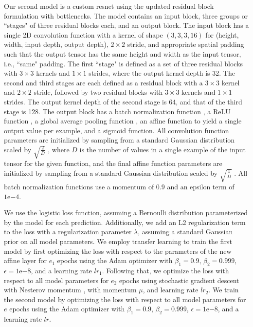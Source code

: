 Our second model is a custom \gls{resnet} using the updated residual block formulation \cite{He:2016tq} with bottlenecks.  The model contains an input block, three groups or ``stages" of three residual blocks each, and an output block.  The input block has a single 2D convolution function with a kernel of shape $(3, 3, 3, 16)$ for (height, width, input depth, output depth), $2\times 2$ stride, and appropriate spatial padding such that the output tensor has the same height and width as the input tensor, i.e., ``same" padding.  The first ``stage" is defined as a set of three residual blocks with $3 \times 3$ kernels and $1\times 1$ strides, where the output kernel depth is 32.  The second and third stages are each defined as a residual block with a $3\times 3$ kernel and $2\times 2$ stride, followed by two residual blocks with $3\times 3$ kernels and $1\times 1$ strides.  The output kernel depth of the second stage is 64, and that of the third stage is 128.  The output block has a batch normalization function \cite{Ioffe:2015ud}, a ReLU function \cite{Nair:2010vq}, a global average pooling function \cite{Lin:2013wb}, an affine function to yield a single output value per example, and a sigmoid function.  All convolution function parameters are initialized by sampling from a standard Gaussian distribution scaled by $\sqrt{\frac{2}{D}}$ \cite{He:2015vx}, where $D$ is the number of values in a single example of the input tensor for the given function, and the final affine function parameters are initialized by sampling from a standard Gaussian distribution scaled by $\sqrt{\frac{1}{D}}$ \cite{LeCun:1998dl}.  All batch normalization functions use a momentum of $0.9$ and an epsilon term of $1\mathrm{e}{-4}$.

We use the logistic loss function, assuming a Bernoulli distribution parameterized by the model for each prediction.  Additionally, we add an L2 regularization term to the loss with a regularization parameter $\lambda$, assuming a standard Gaussian prior on all model parameters.  We employ transfer learning to train the first model by first optimizing the loss with respect to the parameters of the new affine layer for $e_1$ epochs using the Adam optimizer \cite{Kingma:2015us} with $\beta_1 = 0.9$, $\beta_2 = 0.999$, $\epsilon = 1\mathrm{e}{-8}$, and a learning rate $lr_1$.  Following that, we optimize the loss with respect to all model parameters for $e_2$ epochs using stochastic gradient descent with Nesterov momentum \cite{Bengio:2013tc}, with momentum $\mu$, and learning rate $lr_2$.  We train the second model by optimizing the loss with respect to all model parameters for $e$ epochs using the Adam optimizer with $\beta_1 = 0.9$, $\beta_2 = 0.999$, $\epsilon = 1\mathrm{e}{-8}$, and a learning rate $lr$.

